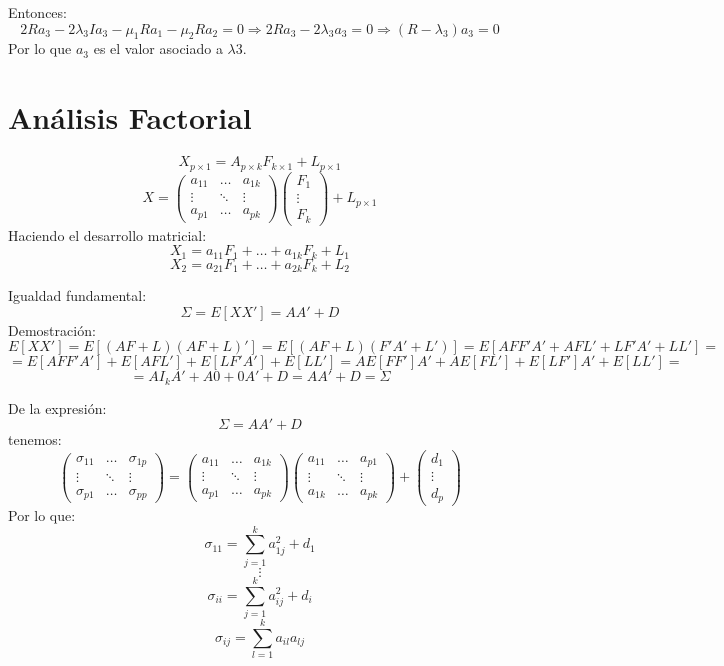 \documentclass[11pt,a4paper]{article}
\begin{document}
Entonces:
$$2Ra_{3} - 2\lambda_{3}Ia_{3} - \mu_{1}Ra_{1} - \mu_{2}Ra_{2} = 0 \Rightarrow 2Ra_{3} - 2\lambda_{3}a_{3} = 0 \Rightarrow (R - \lambda_{3})a_{3} = 0$$
Por lo que $a_{3}$ es el valor asociado a $\lambda{3}$.

\newpage

\section{Análisis Factorial}

$$X_{p \times 1} = A_{p \times k}F_{k \times 1} + L_{p \times 1}$$
$$X = \begin{pmatrix}
a_{11} & \dots & a_{1k} \\
\vdots & \ddots & \vdots \\
a_{p1} & \dots & a_{pk}
\end{pmatrix} \begin{pmatrix} F_{1} \\ \vdots \\ F_{k} \end{pmatrix} + L_{p \times 1}$$
Haciendo el desarrollo matricial:
$$X_{1} = a_{11}F_{1} + \dots + a_{1k}F_{k} + L_{1}$$
$$X_{2} = a_{21}F_{1} + \dots + a_{2k}F_{k} + L_{2}$$

Igualdad fundamental:
$$\Sigma = E[XX'] = AA' + D$$
Demostración:
$$E[XX'] = E[(AF+L)(AF+L)'] = E[(AF+L)(F'A'+L')] = E[AFF'A' + AFL' + LF'A' + LL'] =$$
$$= E[AFF'A'] + E[AFL'] + E[LF'A'] + E[LL'] = AE[FF']A' + AE[FL'] + E[LF']A' + E[LL'] =$$
$$= AI_{k}A' + A0 + 0A' + D = AA' + D = \Sigma$$

De la expresión:
$$\Sigma = AA' + D$$
tenemos:
$$\begin{pmatrix}
\sigma_{11} & \dots & \sigma_{1p} \\
\vdots & \ddots & \vdots \\
\sigma_{p1} & \dots & \sigma_{pp}
\end{pmatrix} = \begin{pmatrix}
a_{11} & \dots & a_{1k} \\
\vdots & \ddots & \vdots \\
a_{p1} & \dots & a_{pk}
\end{pmatrix} \begin{pmatrix}
a_{11} & \dots & a_{p1} \\
\vdots & \ddots & \vdots \\
a_{1k} & \dots & a_{pk}
\end{pmatrix} + \begin{pmatrix} d_{1} \\ \vdots \\ d_{p} \end{pmatrix}$$
Por lo que:
$$\sigma_{11} = \sum_{j=1}^{k} a_{1j}^{2} + d_{1}$$
$$\vdots$$
$$\sigma_{ii} = \sum_{j=1}^{k} a_{ij}^{2} + d_{i}$$
$$\sigma_{ij} = \sum_{l=1}^{k} a_{il}a_{lj}$$
\end{document}
